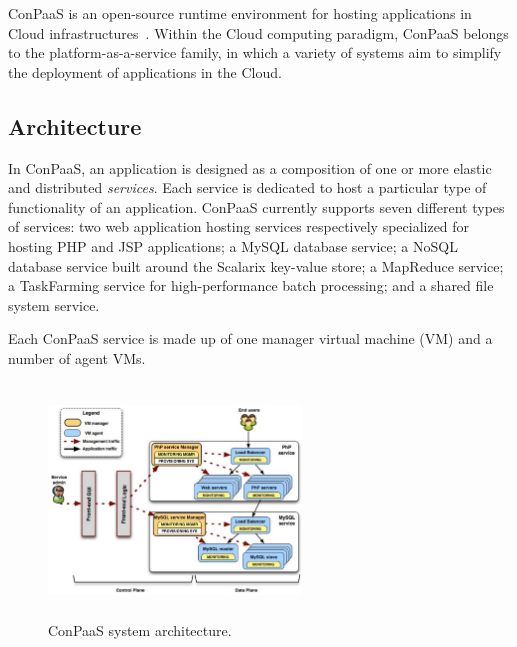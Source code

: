

ConPaaS is an open-source runtime environment for hosting applications
in Cloud infrastructures~\cite{conpaasIC}.  Within the Cloud computing
paradigm, ConPaaS belongs to the platform-as-a-service family, in
which a variety of systems aim to simplify the deployment of
applications in the Cloud.


\subsection*{Architecture}

In ConPaaS, an application is designed as a composition of one or more
elastic and distributed \emph{services}. Each service is dedicated to
host a particular type of functionality of an application. ConPaaS
currently supports seven different types of services: two web
application hosting services respectively specialized for hosting PHP
and JSP applications; a MySQL database service; a NoSQL database
service built around the Scalarix key-value store; a MapReduce
service; a TaskFarming service for high-performance batch
processing; and a shared file system service.

Each ConPaaS service is made up of one manager virtual machine (VM)
and a number of agent VMs.

\begin{figure}[Ht]
\begin{center}
\includegraphics[width=0.6\textwidth, height=6.2cm]{./images/conpaasSystemArch_2}
\end{center}
\vspace{-5mm}
\caption{ConPaaS system architecture.}
\label{arch}
\end{figure}

